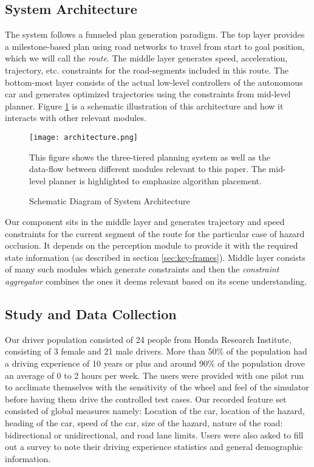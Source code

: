 \documentclass{article}
\begin{document}
\subsection{System Architecture}

The system follows a funneled plan generation paradigm. The top layer 
provides a milestone-based plan using road networks to travel from start to
goal position, which we will call the \textit{route}. The middle layer generates speed, 
acceleration, trajectory, etc. constraints for the road-segments included in this route.
The bottom-most layer consists of the actual low-level controllers of the autonomous car and 
generates optimized trajectories using the constraints from mid-level planner. 
Figure \ref{fig:architecture} is a schematic illustration of this architecture and 
how it interacts with other relevant modules.

\begin{figure}
  \centering
  \texttt{[image: architecture.png]}
  \caption{Schematic Diagram of System Architecture}
  \small
  This figure shows the three-tiered planning system as well as the data-flow between different 
  modules relevant to this paper. The mid-level planner is highlighted to emphasize algorithm placement.
  \label{fig:architecture}
\end{figure}

Our component sits in the middle layer and generates trajectory and speed
constraints for the current segment of the route for the particular case
of hazard occlusion. It depends on the perception 
module to provide it with the required state information (as described in section 
\ref{sec:key-frames}).
Middle layer consists of many such modules which generate constraints
and then the \textit{constraint aggregator} combines the ones it deems relevant based on its
scene understanding.

\subsection{Study and Data Collection}

Our driver population consisted of 24 people from Honda Research Institute, consisting 
of 3 female and 21 male drivers. More than 50\% of the population had a driving
experience of 10 years or plus and around 90\% of the population drove an 
average of 0 to 2 hours per week. The users were provided with one pilot run 
to acclimate themselves with the sensitivity of the wheel and feel of the simulator 
before having them drive the controlled test cases. Our recorded feature set 
consisted of global measures namely: Location of the car, location of the hazard, 
heading of the car, speed of the car, size of the hazard, nature of the road: 
bidirectional or unidirectional, and road lane limits. Users were also asked to 
fill out a survey to note their driving experience statistics and general demographic information.
\end{document}
